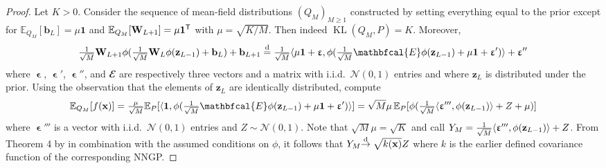 \documentclass[twoside]{article}
\newcommand{\vb}{\mathbf{b}}
\newcommand{\vx}{\mathbf{x}}
\newcommand{\vz}{\mathbf{z}}
\newcommand{\vep}{\bm{\upvarepsilon}}
\newcommand{\vone}{\mathbf{1}}
\newcommand{\mW}{\mathbf{W}}
\newcommand{\E}{\mathbb{E}}
\newcommand{\Q}{\mathbb{Q}}
\renewcommand{\Q}{\ensuremath{Q}}
\newcommand{\T}{\text{\textsf{T}}}
\newcommand{\oto}[1]{\overset{#1}{\to}}
\newcommand{\distto}{\oto{\text{d}}}
\newcommand{\disteq}{\overset{\text{d}}{=}}
\newcommand{\KL}{\operatorname{KL}}
\newcommand{\Normal}{\mathcal{N}}
\DeclarePairedDelimiter\lra{\langle}{\rangle}    %
\theoremstyle{theoremstyle}
\begin{document}
\begin{proof}
    Let $K > 0$.
    Consider the sequence of mean-field distributions $(\Q_M)_{M \ge 1}$ constructed by setting everything equal to the prior except for $\E_{Q_M}[\vb_L]= \mu \vone$ and $\E_{\Q_M}[\mW_{L+1}] = \mu \vone^\T$ with $\mu = \sqrt{K/M}$.
    Then indeed $\KL(Q_M, P) = K$.
    Moreover,
    \begin{equation}
        \tfrac1{\sqrt{M}}\mW_{L+1} \phi(\tfrac1{\sqrt{M}}\mW_L \phi(\vz_{L-1}) + \vb_L) + \vb_{L+1}
        \disteq
        \tfrac1{\sqrt{M}}\lra{\mu \vone + \vep, \phi(\tfrac1{\sqrt{M}}\mathbfcal{E} \phi(\vz_{L-1}) + \mu \vone + \vep')} + \vep''
    \end{equation}
    where $\vep$, $\vep'$, $\vep''$, and $\mathbfcal{E}$ are respectively three vectors and a matrix with i.i.d.\ $\Normal(0,1)$ entries and where $\vz_L$ is distributed under the prior.
    Using the observation that the elements of $\vz_L$ are identically distributed, compute
    \begin{equation}
        \E_{Q_M}[f(\vx)] = \tfrac\mu{\sqrt{M}} \E_{P}[\lra{\vone, \phi(\tfrac1{\sqrt{M}}\mathbfcal{E} \phi(\vz_{L-1}) + \mu \vone + \vep')}]
        = \sqrt{M} \mu\, \E_{P}[\phi(\tfrac1{\sqrt{M}}\lra{\vep''', \phi(\vz_{L-1})} + Z + \mu)]
    \end{equation}
    where $\vep'''$ is a vector with i.i.d.\ $\Normal(0, 1)$ entries and $Z \sim \Normal(0, 1)$.
    Note that $\sqrt{M}\mu = \sqrt{K}$ and
    call $Y_M = \tfrac1{\sqrt{M}}\lra{\vep''', \phi(\vz_{L-1})} + Z$.
    From Theorem 4 by \citet{matthews_2018} in combination with the assumed conditions on $\phi$, it follows that $Y_M \smash{\distto \sqrt{k(\vx)}} Z$ where $k$ is the earlier defined covariance function of the corresponding NNGP.
    

\end{proof}
\end{document}
